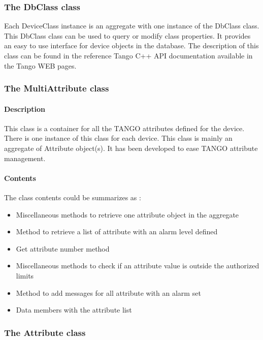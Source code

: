 \subsubsection{The DbClass class}

Each DeviceClass instance is an aggregate with one instance of the
DbClass class. This DbClass class can be used to query or modify class
properties. It provides an easy to use interface
for device objects in the database. The description of this class
can be found in the reference Tango C++ API documentation available
in the Tango WEB pages.


\subsubsection{The MultiAttribute class}


\paragraph{Description}

This class is a container for all the TANGO attributes defined for
the device. There is one instance of this class for each device. This
class is mainly an aggregate of Attribute object(s). It has been developed
to ease TANGO attribute management.


\paragraph{Contents}

The class contents could be summarizes as :
\begin{itemize}
\item Miscellaneous methods to retrieve one attribute
object in the aggregate
\item Method to retrieve a list of attribute with an alarm level defined
\item Get attribute number method
\item Miscellaneous methods to check if an attribute value is outside the
authorized limits
\item Method to add messages for all attribute with an alarm set
\item Data members with the attribute list
\end{itemize}

\subsubsection{The Attribute class}


